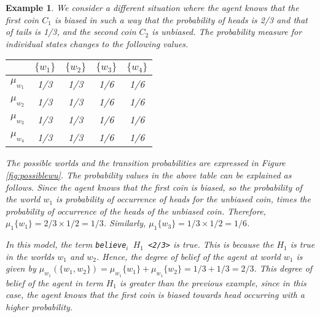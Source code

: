 \documentclass[12pt]{article}
\newtheorem{example}[theorem]{Example}
\begin{document}
\begin{example} {\em We consider a different situation where the agent knows that the first coin $C_1$ is biased in such a way that the probability of heads is 2/3  and that of tails is 1/3, and the second coin $C_2$ is unbiased. The probability measure for individual states changes to the following values.

\begin{center}
\begin{tabular}{|c|c|c|c|c|}
\hline
&  $\{w_1\}$ &$\{w_2\}$ &$\{w_3\}$ & $\{w_4\}$\\ 
\hline
$\mu_{w_1}$& 1/3 & 1/3 & 1/6 &1/6\\ 
\hline
$\mu_{w_2}$& 1/3 & 1/3 & 1/6 &1/6\\ 
\hline
$\mu_{w_3}$& 1/3 & 1/3 & 1/6 &1/6\\ 
\hline
$\mu_{w_4}$& 1/3 & 1/3 & 1/6 &1/6\\ 
\hline
\end{tabular}
\end{center}


The possible worlds and the transition probabilities are expressed in Figure \ref{fig:possiblewu}. The probability values in the above table can be explained as follows. Since the agent knows that the first coin is biased, so the probability of the world $w_1$ is probability of occurrence of heads for the unbiased coin, times the probability of occurrence of the heads of the unbiased coin. Therefore, $\mu_1\{w_1\}=2/3\times 1/2 =1/3$. Similarly, $\mu_1\{w_3\}=1/3\times 1/2 =1/6$. 

In this model, the term \texttt{believe$_i$ $H_1$ <2/3>} is true. This is because the $H_1$ is true in the worlds $w_1$ and $w_2$. Hence, the degree of belief of the agent at world $w_1$ is given by $\mu_{w_1}(\{w_1,w_2\})=\mu_{w_1}\{w_1\}+\mu_{w_1}\{w_2\} =1/3 + 1/3 =2/3$. This degree of belief of the agent in term $H_1$ is greater than the previous example, since in this case, the agent knows that the first coin is biased towards head occurring with a higher probability.
\begin{figure}
\begin{center}
\end{center}
\end{figure}}
\end{example}
\end{document}
